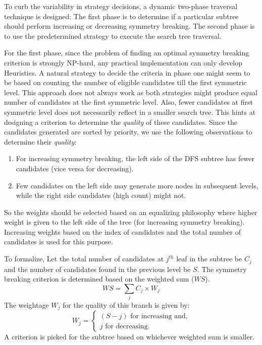 To curb the variability in strategy decisions, a dynamic two-phase traversal technique is designed:
The first phase is to determine if a particular subtree should perform increasing or decreasing symmetry breaking.
The second phase is to use the predetermined strategy to execute the search tree traversal.

For the first phase, since the problem of finding an optimal symmetry breaking criterion is strongly NP-hard, any practical implementation can only develop Heuristics.
A natural strategy to decide the criteria in phase one might seem to be based on counting the number of eligible candidates till the first symmetric level.
This approach does not always work as both strategies might produce equal number of candidates at the first symmetric level.
Also, fewer candidates at first symmetric level does not necessarily reflect in a smaller search tree.
This hints at designing a criterion to determine the \textit{quality} of these candidates.
Since the candidates generated are sorted by priority, we use the following observations to determine their \textit{quality}:
\begin{enumerate}[1.]
    \item For increasing symmetry breaking, the left side of the DFS subtree has fewer candidates (vice versa for decreasing).
    \item Few candidates on the left side may generate more nodes in subsequent levels, while the right side candidates (high count) might not.
\end{enumerate}
So the weights should be selected based on an equalizing philosophy where higher weight is given to the left side of the tree (for increasing symmetry breaking).
Increasing weights based on the index of candidates and the total number of candidates is used for this purpose.

To formalize, Let the total number of candidates at $j^{th}$ leaf in the subtree be $C_j$ and the number of candidates found  in the previous level be $S$.
The symmetry breaking criterion is determined based on the weighted sum ($WS$).
$$WS = \sum_j C_j\times W_j$$
The weightage $W_j$ for the quality of this branch is given by:
$$
    W_j=\begin{cases}
        (S - j) \text{ for increasing and,} \\
        j \text{ for decreasing}.
    \end{cases}
$$
A criterion is picked for the subtree based on whichever weighted sum is smaller.

